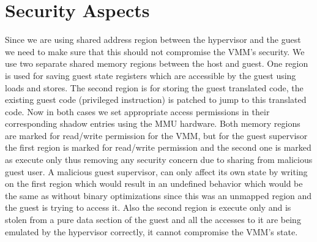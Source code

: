 \section{Security Aspects}
Since we are using shared address region between the hypervisor and the guest we need to make sure that this should not compromise the VMM's security. We use two separate shared memory regions between the host and guest. One region is used for saving guest state registers which are accessible by the guest using loads and stores. The second region is for storing the guest translated code, the existing guest code (privileged instruction) is patched to jump to this translated code. Now in both cases we set appropriate access permissions in their corresponding shadow entries using the MMU hardware. Both memory regions are marked for read/write permission for the VMM, but for the guest supervisor the first region is marked for read/write permission and the second one is marked as execute only thus removing any security concern due to sharing from malicious guest user. A malicious guest supervisor, can only affect its own state by writing on the first region which would result in an undefined behavior which would be the same as without binary optimizations since this was an unmapped region and the guest is trying to access it. Also the second region is execute only and is stolen from a pure data section of the guest and all the accesses to it are being emulated by the hypervisor correctly, it cannot compromise the VMM’s state.


